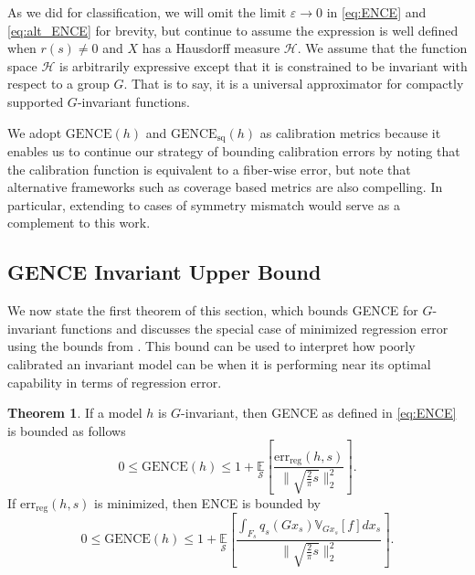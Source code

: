 \documentclass[10pt]{article} %
\theoremstyle{definition}
\newtheorem{thm}{Theorem}
\newcommand{\GENCE}{\mathrm{GENCE}(h)}
\newcommand{\GENCESQ}{\mathrm{GENCE}_{\mathrm{sq}}(h)}
\begin{document}
As we did for classification, we will omit the limit $\varepsilon \to 0$ in \cref{eq:ENCE} and \cref{eq:alt_ENCE} for brevity, but continue to assume the expression is well defined when $r(s) \neq 0$ and $X$ has a Hausdorff measure $\mathcal{H}$.
%
We assume that the function space $\mathscr{H}$ is arbitrarily expressive except that it is constrained to be invariant with respect to a group $G$. That is to say, it is a universal approximator for compactly supported $G$-invariant functions.

We adopt $\GENCE$ and $\GENCESQ$ as calibration metrics because it enables us to continue our strategy of bounding calibration errors by noting that the calibration function is equivalent to a fiber-wise error, but note that alternative frameworks such as coverage based metrics are also compelling. In particular, extending \cite{dobriban2025symmpi} to cases of symmetry mismatch would serve as a complement to this work.

\subsection{GENCE Invariant Upper Bound} 
We now state the first theorem of this section, which bounds GENCE for $G$-invariant functions and discusses the special case of minimized regression error using the bounds from \cite{wang2024general}. This bound can be used to interpret how poorly calibrated an invariant model can be when it is performing near its optimal capability in terms of regression error.

\begin{thm} \label{thm:GENCE_UB}
If a model $h$ is $G$-invariant, then GENCE as defined in \cref{eq:ENCE} is bounded as follows $$0 \leq \GENCE \leq 1 + \underset{\mathcal{S}}{\mathbb{E}}\left[\frac{\text{err}_{\text{reg}}(h, s)}{ \lVert \sqrt{\frac{2}{\pi}s}   \rVert_2^2}\right].$$ If $\text{err}_{\text{reg}}(h, s)$ is minimized, then ENCE is bounded by $$0 \leq \GENCE \leq 1 + \underset{\mathcal{S}}{\mathbb{E}}\left[\frac{\int_{F_s}q_s(Gx_s) \mathbb{V}_{Gx_s}[f]dx_s}{ \lVert \sqrt{\frac{2}{\pi}s} \rVert_2^2}\right].$$
\end{thm}
\end{document}
